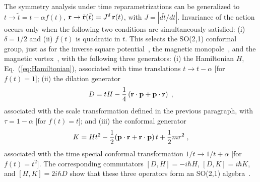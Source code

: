 \documentclass[a4paper,twocolumn,
showpacs,amssymb,aps,prl,superscriptaddress]{revtex4}%
\begin{document}
The symmetry analysis under time reparametrizations can be
generalized to~\cite{jac:80,jac:90} $t \rightarrow \tilde{t} = t -
\alpha f(t) $, ${\bf r} \rightarrow \tilde{\bf r} (\tilde{t}) =
J^{\delta} \, {\bf r}(t)$, with $J= |d \tilde{t}/dt|$. Invariance
of the action occurs only when the following two conditions are
simultaneously satisfied: (i) $\delta=1/2$ and (ii) $f(t)$ is
quadratic in $t$. This selects the SO(2,1) conformal group, just
as for the inverse square potential~\cite{alf:76}, the magnetic
monopole~\cite{jac:80}, and the magnetic vortex~\cite{jac:90},
with the following three generators: (i) the Hamiltonian $H$,
Eq.~(\ref{eq:Hamiltonian}), associated with time translations $t
\rightarrow t - \alpha $
 [for $f(t) =1$];
(ii) the dilation generator
\begin{equation}
D= t H - \frac{1}{4} \left( {\bf r} \cdot {\bf p} + {\bf p} \cdot
{\bf r}
 \right)
 \;  ,
\end{equation}
associated with the scale transformation defined in the previous
paragraph, with $\tau= 1 - \alpha$ [for $f(t)=t$]; and (iii) the
conformal generator
\begin{equation}
K= H t^{2} - \frac{1}{2} ({\bf p} \cdot {\bf r} + {\bf r} \cdot
{\bf p} ) \,
 t + \frac{1}{2} m
r^{2}
 \;  ,
\end{equation}
associated with the time special conformal transformation $1/t
\rightarrow 1/t + \alpha$ [for $f(t)=t^{2}$].
 The corresponding
commutators $[D,H]= -i \hbar H$, $[D,K]= i \hbar K$, and $[H,K]=
2 i \hbar D$ show that these three operators form an SO(2,1)
algebra~\cite{wyb:74}.
\end{document}
